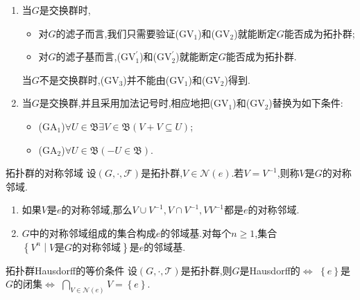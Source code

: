 \begin{remark}{}{}
	\begin{enumerate}
		\item 当$G$是交换群时,
	\begin{itemize}
		\item 对$G$的滤子而言,我们只需要验证($\mathrm{GV}_{1}$)和($\mathrm{GV}_{2}$)就能断定$G$能否成为拓扑群;
		\item 对$G$的滤子基而言,($\mathrm{GV}_{1}^{\prime}$)和($\mathrm{GV}_{2}^{\prime}$)就能断定$G$能否成为拓扑群.
	\end{itemize}
	当$G$不是交换群时,($\mathrm{GV}_{3}$)并不能由($\mathrm{GV}_{1}$)和($\mathrm{GV}_{2}$)得到.
		\item 当$G$是交换群,并且采用加法记号时,相应地把($\mathrm{GV}_{1}$)和($\mathrm{GV}_{2}$)替换为如下条件:
	\begin{itemize}
		\item ($\mathrm{GA}_{1}$)$\forall U\in\mathfrak{B}\exists V\in\mathfrak{B}\left(V+V\subseteq U\right)$;
		\item ($\mathrm{GA}_{2}$)$\forall U\in\mathfrak{B}\left(-U\in\mathfrak{B}\right)$.
	\end{itemize}
	\end{enumerate}
\end{remark}

\begin{definition}{拓扑群的对称邻域}{}
	设$\left(G,\cdot,\mathscr{F}\right)$是拓扑群,$V\in\mathcal{N}\left(e\right)$.若$V=V^{-1}$,则称$V$是$G$的对称邻域.
\end{definition}

\begin{remark}{}{}
	\begin{enumerate}
		\item 如果$V$是$e$的对称邻域,那么$V\cup V^{-1},V\cap V^{-1},VV^{-1}$都是$e$的对称邻域.
		\item $G$中的对称邻域组成的集合构成$e$的邻域基.对每个$n\geq 1$,集合$\left\{V^{n}\middle|V\text{是}G\text{的对称邻域}\right\}$是$e$的邻域基.
	\end{enumerate}
\end{remark}

\begin{proposition}{拓扑群Hausdorff的等价条件}{}
	设$\left(G,\cdot,\mathscr{T}\right)$是拓扑群,则$G$是Hausdorff的$\iff$ $\left\{e\right\}$是$G$的闭集$\iff$ $\bigcap\limits_{V\in\mathcal{N}\left(e\right)}V=\left\{e\right\}$.
\end{proposition}

